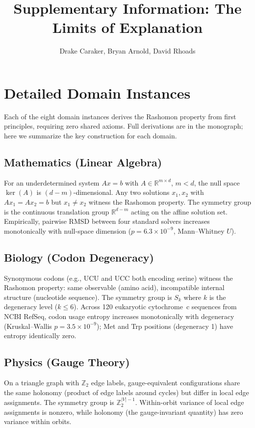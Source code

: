 \documentclass[11pt]{article}
\title{Supplementary Information: The Limits of Explanation}
\author{Drake Caraker, Bryan Arnold, David Rhoads}
\date{}
\newcommand{\R}{\mathbb{R}}
\begin{document}
\maketitle

\section{Detailed Domain Instances}

Each of the eight domain instances derives the Rashomon property from first principles, requiring zero shared axioms.  Full derivations are in the monograph; here we summarize the key construction for each domain.

\subsection{Mathematics (Linear Algebra)}
For an underdetermined system $Ax = b$ with $A \in \R^{m \times d}$, $m < d$, the null space $\ker(A)$ is $(d-m)$-dimensional.  Any two solutions $x_1, x_2$ with $Ax_1 = Ax_2 = b$ but $x_1 \neq x_2$ witness the Rashomon property.  The symmetry group is the continuous translation group $\R^{d-m}$ acting on the affine solution set.  Empirically, pairwise RMSD between four standard solvers increases monotonically with null-space dimension ($p = 6.3 \times 10^{-9}$, Mann--Whitney $U$).

\subsection{Biology (Codon Degeneracy)}
Synonymous codons (e.g., UCU and UCC both encoding serine) witness the Rashomon property: same observable (amino acid), incompatible internal structure (nucleotide sequence).  The symmetry group is $S_k$ where $k$ is the degeneracy level ($k \leq 6$).  Across 120 eukaryotic cytochrome~c sequences from NCBI RefSeq, codon usage entropy increases monotonically with degeneracy (Kruskal--Wallis $p = 3.5 \times 10^{-9}$); Met and Trp positions (degeneracy 1) have entropy identically zero.

\subsection{Physics (Gauge Theory)}
On a triangle graph with $\mathbb{Z}_2$ edge labels, gauge-equivalent configurations share the same holonomy (product of edge labels around cycles) but differ in local edge assignments.  The symmetry group is $\mathbb{Z}_2^{|V|-1}$.  Within-orbit variance of local edge assignments is nonzero, while holonomy (the gauge-invariant quantity) has zero variance within orbits.
\end{document}
